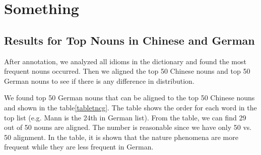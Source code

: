 \section{Something}

\subsection{Results for Top Nouns in Chinese and German}\label{firstresult}
After annotation, we analyzed all idioms in the dictionary and found the most frequent nouns occurred. Then we aligned the top 50 Chinese nouns and top 50 German nouns to see if there is any difference in distribution. 

We found top 50 German nouns that can be aligned to the top 50 Chinese nouns and shown in the table\ref{tabletncg}. The table shows the order for each word in the top list (e.g. Mann is the 24th in German list). From the table, we can find 29 out of 50 nouns are aligned. The number is reasonable since we have only 50 vs. 50 alignment. In the table, it is shown that the nature phenomena are more frequent while they are less frequent in German. 

